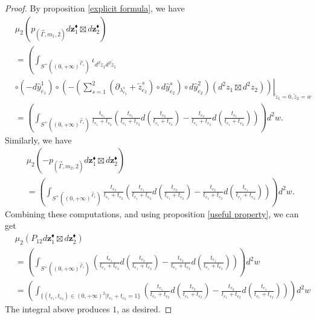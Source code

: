 \documentclass[11pt]{amsart}
\theoremstyle{definition}
\theoremstyle{remark}
\numberwithin{equation}{section}
\begin{document}
\begin{proof}
          By proposition \ref{explicit formula}, we have
        \begin{align*}
            &\mu_{2}(p_{(\vec{\Gamma},m_{1},2)} d \mathbf{z}^{\blacklozenge}_{1}\boxtimes d \mathbf{z}^{\blacklozenge}_{2}) \\
            &=\left(\int_{S^{+}((0,+\infty)^{\vec{\Gamma}_{1}})}
        \iota_{d^{2}\tilde{z}_{1}d^{2}\bar{\tilde{z}}_{1}}\right.\\
        &\left.\left.\circ (-d\hat{y}_{e_{1}}^{1})\circ(-(\sum_{s=1}^{2}(\partial_{\lambda_{e_{2}}^{s}}+\tilde{z}_{e_{2}}^{s})\circ d\hat{y}_{e_{2}}^{s})\circ d\hat{y}_{e_{2}}^{2})
        (d^{2}z_{1}\boxtimes d^{2}z_{2})\right)\right|_{\tilde{z}_{1}=0,\tilde{z}_{2}=w}\\
        &=
        \left(\int_{S^{+}((0,+\infty)^{\vec{\Gamma}_{1}})}\frac{t_{e_{1}}}{t_{e_{1}}+t_{e_{2}}}\left(\frac{t_{e_{1}}}{t_{e_{1}}+t_{e_{2}}}d(\frac{t_{e_{2}}}{t_{e_{1}}+t_{e_{2}}})-\frac{t_{e_{2}}}{t_{e_{1}}+t_{e_{2}}}d(\frac{t_{e_{1}}}{t_{e_{1}}+t_{e_{2}}})\right)\right)d^{2}w.
        \end{align*}
        Similarly, we have
        \begin{align*}
            &\mu_{2}(-p_{(\vec{\Gamma},m_{2},2)} 
            d \mathbf{z}^{\blacklozenge}_{1}\boxtimes d \mathbf{z}^{\blacklozenge}_{2})\\
            &=
        \left(\int_{S^{+}((0,+\infty)^{\vec{\Gamma}_{1}})}\frac{t_{e_{2}}}{t_{e_{1}}+t_{e_{2}}}\left(\frac{t_{e_{1}}}{t_{e_{1}}+t_{e_{2}}}d(\frac{t_{e_{2}}}{t_{e_{1}}+t_{e_{2}}})-\frac{t_{e_{2}}}{t_{e_{1}}+t_{e_{2}}}d(\frac{t_{e_{1}}}{t_{e_{1}}+t_{e_{2}}})\right)\right)d^{2}w.
        \end{align*}
        Combining these computations, and using proposition \ref{useful property}, we can get
        \begin{align*}
            &\mu_{2}(P_{12}
            d \mathbf{z}^{\blacklozenge}_{1}\boxtimes d \mathbf{z}^{\blacklozenge}_{2})\\
            &=
        \left(\int_{S^{+}((0,+\infty)^{\vec{\Gamma}_{1}})}\left(\frac{t_{e_{1}}}{t_{e_{1}}+t_{e_{2}}}d(\frac{t_{e_{2}}}{t_{e_{1}}+t_{e_{2}}})-\frac{t_{e_{2}}}{t_{e_{1}}+t_{e_{2}}}d(\frac{t_{e_{1}}}{t_{e_{1}}+t_{e_{2}}})\right)\right)d^{2}w\\
        &=\left(\int_{\{(t_{e_{1}},t_{e_{2}})\in (0,+\infty)^2|t_{e_{1}}+t_{e_{2}}=1\}}\left(\frac{t_{e_{1}}}{t_{e_{1}}+t_{e_{2}}}d(\frac{t_{e_{2}}}{t_{e_{1}}+t_{e_{2}}})-\frac{t_{e_{2}}}{t_{e_{1}}+t_{e_{2}}}d(\frac{t_{e_{1}}}{t_{e_{1}}+t_{e_{2}}})\right)\right)d^{2}w
        \end{align*}
        The integral above produces $1$, as desired.
    \end{proof}
\end{document}
